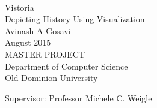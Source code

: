 
\thispagestyle{empty}
\mbox{}\\[6pc]
\begin{center}
\Huge{Vistoria\\ Depicting History Using Visualization}\\[2pc]

\Large{Avinash A Gosavi}\\[1pc]
\large{August 2015}\\[2pc]

MASTER PROJECT\\
Department of Computer Science\\
Old Dominion University
\end{center}
\vfill

\noindent Supervisor: Professor Michele C. Weigle

